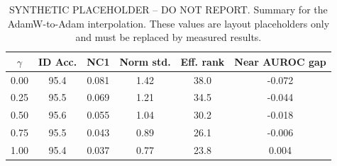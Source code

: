 \begin{table}[t]
\caption{SYNTHETIC PLACEHOLDER -- DO NOT REPORT. Summary for the
AdamW-to-Adam interpolation. These values are layout placeholders only and must
be replaced by measured results.}
\label{tab:dummy-interpolation-summary}
\begin{center}
\footnotesize
\setlength{\tabcolsep}{5pt}
\renewcommand{\arraystretch}{1.15}
\begin{tabular}{@{}cccccc@{}}
\toprule
\(\gamma\) & ID Acc. & NC1 & Norm std. & Eff. rank & Near AUROC gap \\
\midrule
0.00 & 95.4 & 0.081 & 1.42 & 38.0 & -0.072 \\
0.25 & 95.5 & 0.069 & 1.21 & 34.5 & -0.044 \\
0.50 & 95.6 & 0.055 & 1.04 & 30.2 & -0.018 \\
0.75 & 95.5 & 0.043 & 0.89 & 26.1 & -0.006 \\
1.00 & 95.4 & 0.037 & 0.77 & 23.8 &  0.004 \\
\bottomrule
\end{tabular}
\end{center}
\end{table}
